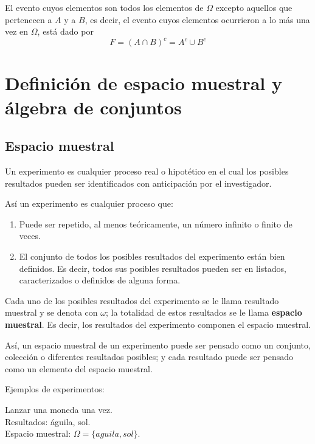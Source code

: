 \begin{remark}
El evento cuyos elementos son todos los elementos de $\Omega$ excepto aquellos que pertenecen a $A$ y a $B$, es decir, el evento cuyos elementos ocurrieron a lo más una vez en $\Omega$, está dado por
\begin{equation*}
F=(A\cap B)^{c}=A^{c}\cup B^{c}
\end{equation*}
\end{remark}


\section{Definición de espacio muestral y álgebra de conjuntos}
 
\subsection{Espacio muestral}

\begin{definition}
Un experimento es cualquier proceso real o hipotético en el cual los posibles resultados pueden ser identificados con anticipación por el investigador.
\end{definition}

Así un experimento es cualquier proceso que:
\begin{enumerate}
\item Puede ser repetido, al menos teóricamente, un número infinito o finito
de veces.
\item El conjunto de todos los posibles resultados del experimento están bien definidos. Es decir, todos sus posibles resultados pueden ser en listados, caracterizados o definidos de alguna forma.
\end{enumerate}

Cada uno de los posibles resultados del experimento se le llama resultado muestral y se denota con $\omega$; la totalidad de estos resultados se le llama \textbf{espacio muestral}. Es decir, los resultados del experimento componen el espacio muestral.

Así, un espacio muestral de un experimento puede ser pensado como un conjunto, colección o diferentes resultados posibles; y cada resultado puede ser pensado como un elemento del espacio muestral.

Ejemplos de experimentos:

\begin{example}
Lanzar una moneda una vez. \\
Resultados: águila, sol. \\ 
Espacio muestral: $\Omega=\{aguila, sol\}$.\\   
\end{example}

